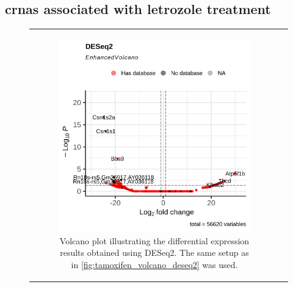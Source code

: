 \subsection{\Glspl{crna} associated with letrozole treatment}

\begin{figure}[H] \begin{tabular}{cc} \begin{subfigure}{0.5\textwidth}
                 \centering

                 \includegraphics[width=\linewidth]{chapters/4_results_and_discussion/figures/dea/deseq2/letrozole/volcano.png}
                 \caption{Volcano plot illustrating the differential expression
                     results obtained using DESeq2.
                     The same setup as in \cref{fig:tamoxifen_volcano_deseq2} was used.
                 }
                 \label{fig:letrozole_volcano_deseq2}
             \end{subfigure}
        \begin{subfigure}{0.5\textwidth}
            \centering


\end{subfigure}
\end{tabular}
\end{figure}
